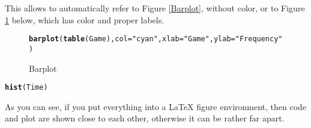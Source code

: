 \documentclass[a4paper]{article}\usepackage[]{graphicx}\usepackage[]{color}
\makeatletter
\newcommand{\hlstr}[1]{\textcolor[rgb]{0.192,0.494,0.8}{#1}}%
\newcommand{\hlstd}[1]{\textcolor[rgb]{0.345,0.345,0.345}{#1}}%
\newcommand{\hlkwc}[1]{\textcolor[rgb]{0.333,0.667,0.333}{#1}}%
\newcommand{\hlkwd}[1]{\textcolor[rgb]{0.737,0.353,0.396}{\textbf{#1}}}%
\newenvironment{kframe}{%
 \def\at@end@of@kframe{}%
 \ifinner\ifhmode%
  \def\at@end@of@kframe{\end{minipage}}%
  \begin{minipage}{\columnwidth}%
 \fi\fi%
 \def\FrameCommand##1{\hskip\@totalleftmargin \hskip-\fboxsep
 \colorbox{shadecolor}{##1}\hskip-\fboxsep
     \hskip-\linewidth \hskip-\@totalleftmargin \hskip\columnwidth}%
 \MakeFramed {\advance\hsize-\width
   \@totalleftmargin\z@ \linewidth\hsize
   \@setminipage}}%
 {\par\unskip\endMakeFramed%
 \at@end@of@kframe}
\newenvironment{knitrout}{}{} %
\makeatother
\begin{document}
This allows to automatically refer to Figure \ref{Barplot}, without color, or to Figure \ref{Barplot 2} below, which has color and proper labels.

\begin{figure}
\begin{center}
\begin{knitrout}
\color{fgcolor}\begin{kframe}
\begin{alltt}
\hlkwd{barplot}\hlstd{(}\hlkwd{table}\hlstd{(Game),}\hlkwc{col}\hlstd{=}\hlstr{"cyan"}\hlstd{,}\hlkwc{xlab}\hlstd{=}\hlstr{"Game"}\hlstd{,}\hlkwc{ylab}\hlstd{=}\hlstr{"Frequency"}\hlstd{)}
\end{alltt}


{\ttfamily\noindent\bfseries\color{errorcolor}{\#\# Error in table(Game): object 'Game' not found}}\end{kframe}
\end{knitrout}
\caption{Barplot} \label{Barplot 2}
\end{center}
\end{figure}

\begin{knitrout}
\color{fgcolor}\begin{kframe}
\begin{alltt}
\hlkwd{hist}\hlstd{(Time)}
\end{alltt}


{\ttfamily\noindent\bfseries\color{errorcolor}{\#\# Error in hist(Time): object 'Time' not found}}\end{kframe}
\end{knitrout}

As you can see, if you put everything into a LaTeX figure environment, then code and plot are shown close to each other, otherwise it can be rather far apart.
\end{document}
